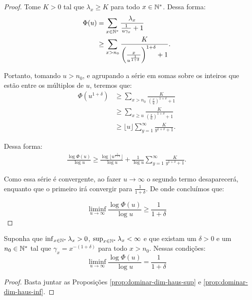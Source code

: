 \begin{proof}
  Tome $K > 0$ tal que $\lambda_x \geq K$ para todo $x \in {\mathbb{N^*}}$. Dessa
  forma:
  \begin{align*}
    \Phi(u) &= \sum_{x \in {\mathbb{N^*}}} \frac{\lambda_x}{\frac{1}{u\gamma_x} +
      1}\\
    &\geq \sum_{x > n_0}
    \frac{K}{\left(\frac{x}{u^{\frac{1}{1+\delta}}}\right)^{1+\delta} +1}.
  \end{align*}

  Portanto, tomando $u > n_0$, e agrupando a série em somas sobre os inteiros
  que estão entre os múltiplos de $u$, teremos que:
  \begin{align*}
    \Phi(u^{1+\delta}) 
    &\geq \sum_{x > n_0}
    \frac{K}{\left(\frac{x}{u}\right)^{1+\delta} +1}\\
    &\geq \sum_{x \geq u}
    \frac{K}{\left(\frac{x}{u}\right)^{1+\delta} +1}\\
    &\geq \lfloor u \rfloor \sum_{y = 1}^{\infty}
    \frac{K}{y^{1+\delta} + 1}.
  \end{align*}

  Dessa forma:
  \begin{align*}
    \frac{\log \Phi(u)}{\log u} \geq \frac{\log\lfloor
      u^{\frac{1}{1+\delta}} \rfloor }{\log u} + 
    \frac{1}{\log u} \sum_{y = 1}^{\infty}
    \frac{K}{y^{1+\delta} + 1}.
  \end{align*}

  Como essa série é convergente, ao fazer $u \to \infty$ o segundo
  termo desaparecerá, enquanto que o primeiro irá convergir para
  $\frac{1}{1+\delta}$. De onde concluímos que:

  \begin{displaymath}
    \liminf_{u \to \infty} \frac{\log \Phi (u)}{\log u} \geq \frac{1}{1+\delta}
  \end{displaymath}
\end{proof}

\begin{corolario}
  \label{prop:igualar-dim-haus}
  Suponha que $\inf_{x \in {\mathbb{N^*}}} \lambda_x > 0$, $\sup_{x \in {\mathbb{N^*}}}
  \lambda_x < \infty$ e que existam um $\delta > 0$ e um $n_0 \in {\mathbb{N^*}}$
  tal que $\gamma_x = x^{-(1+\delta)}$ para todo $x > n_0$.  Nessas
  condições:
  \begin{displaymath}
    \liminf_{u \to \infty} \frac{\log \Phi(u)}{\log u} = \frac{1}{1+\delta}
  \end{displaymath}
\end{corolario}
\begin{proof}
  Basta juntar as Proposições \ref{prop:dominar-dim-haus-sup} e
  \ref{prop:dominar-dim-haus-inf}.
\end{proof}



